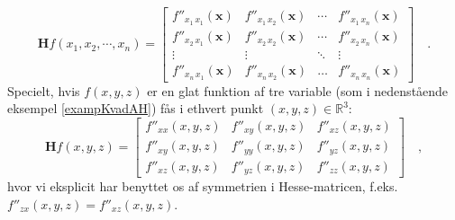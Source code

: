 \begin{equation}
\mathbf{H}f(x_{1}, x_{2}, \cdots, x_{n}) = \left[
                                             \begin{array}{cccc}
                                               f''_{x_{1}\,x_{1}}(\mathbf{x}) & f''_{x_{1}\,x_{2}}(\mathbf{x}) & \cdots & f''_{x_{1}\,x_{n}}(\mathbf{x}) \\
f''_{x_{2}\,x_{1}}(\mathbf{x}) & f''_{x_{2}\,x_{2}}(\mathbf{x}) & \cdots & f''_{x_{2}\,x_{n}}(\mathbf{x}) \\
\vdots & \vdots & \ddots & \vdots \\
f''_{x_{n}\,x_{1}}(\mathbf{x}) & f''_{x_{n}\,x_{2}}(\mathbf{x}) & \ldots & f''_{x_{n}\,x_{n}}(\mathbf{x})
                                             \end{array}
                                           \right] \quad .
\end{equation}
Specielt, hvis $f(x,y,z)$ er en glat funktion af tre variable (som i nedenstående eksempel \ref{exampKvadAH}) fås i ethvert punkt $(x,y,z) \in \mathbb{R}^{3}$:
\begin{equation}
\mathbf{H}f(x, y, z) = \left[
                                             \begin{array}{ccc}
                                               f''_{xx}(x,y,z) & f''_{xy}(x,y,z)  & f''_{xz}(x,y,z)  \\
f''_{xy}(x,y,z)  & f''_{yy}(x,y,z)  & f''_{yz}(x,y,z)  \\
f''_{xz}(x,y,z) & f''_{yz}(x,y,z)  &  f''_{zz}(x,y,z)
                                             \end{array}
                                           \right] \quad ,
\end{equation}
hvor vi eksplicit har benyttet os af symmetrien i Hesse-matricen, f.eks. $f''_{zx}(x,y,z) = f''_{xz}(x,y,z) $.




